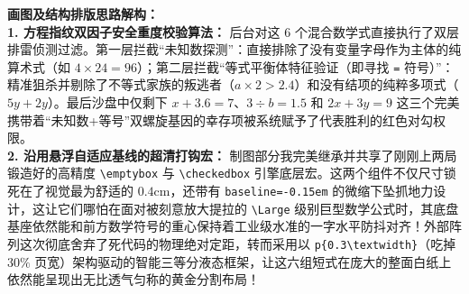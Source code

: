\vspace{0.4cm}
{\small\color{blue!70!black}
\textbf{画图及结构排版思路解构：}\\
\textbf{1. 方程指纹双因子安全重度校验算法：} 后台对这 6 个混合数学式直接执行了双层排雷侦测过滤。第一层拦截“未知数探测”：直接排除了没有变量字母作为主体的纯算术式（如 $4 \times 24 = 96$）；第二层拦截“等式平衡体特征验证（即寻找 \texttt{=} 符号）”：精准狙杀并剔除了不等式家族的叛逃者（$a \times 2 > 2.4$）和没有结项的纯粹多项式（$5y + 2y$）。最后沙盘中仅剩下 $x + 3.6 = 7$、$3 \div b = 1.5$ 和 $2x + 3y = 9$ 这三个完美携带着“未知数+等号”双螺旋基因的幸存项被系统赋予了代表胜利的红色对勾权限。\\
\textbf{2. 沿用悬浮自适应基线的超清打钩宏：} 制图部分我完美继承并共享了刚刚上两局锻造好的高精度 \texttt{\textbackslash{}emptybox} 与 \texttt{\textbackslash{}checkedbox} 引擎底层宏。这两个组件不仅尺寸锁死在了视觉最为舒适的 $0.4\mathrm{cm}$，还带有 \texttt{baseline=-0.15em} 的微缩下坠抓地力设计，这让它们哪怕在面对被刻意放大提拉的 \texttt{\textbackslash{}Large} 级别巨型数学公式时，其底盘基座依然能和前方数学符号的重心保持着工业级水准的一字水平防抖对齐！外部阵列这次彻底舍弃了死代码的物理绝对定距，转而采用以 \texttt{p\{0.3\textbackslash{}textwidth\}}（吃掉 $30\%$ 页宽）架构驱动的智能三等分液态框架，让这六组短式在庞大的整面白纸上依然能呈现出无比透气匀称的黄金分割布局！
}
\newpage


